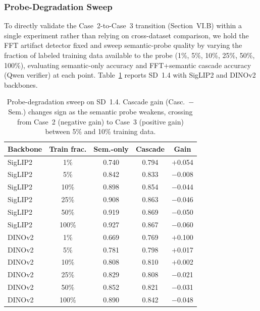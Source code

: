 \documentclass{ieeeaccess}
\begin{document}
\subsubsection{Probe-Degradation Sweep}
\label{sec:limited_data}

To directly validate the Case~2-to-Case~3 transition (Section~VI.B) within a single
experiment rather than relying on cross-dataset comparison, we hold the FFT artifact
detector fixed and sweep semantic-probe quality by varying the fraction of labeled
training data available to the probe (1\%, 5\%, 10\%, 25\%, 50\%, 100\%), evaluating
semantic-only accuracy and FFT+semantic cascade accuracy (Qwen verifier) at each point.
Table~\ref{tab:limited_data} reports SD~1.4 with SigLIP2 and DINOv2 backbones.

\begin{table}[h]
\centering
\caption{Probe-degradation sweep on SD~1.4. Cascade gain (Casc.\ $-$ Sem.) changes sign
as the semantic probe weakens, crossing from Case~2 (negative gain) to Case~3 (positive
gain) between 5\% and 10\% training data.}
\label{tab:limited_data}
\small
\begin{tabular}{lcccc}
\toprule
Backbone & Train frac. & Sem.-only & Cascade & Gain \\
\midrule
SigLIP2  & 1\%   & 0.740 & 0.794 & $+$0.054 \\
SigLIP2  & 5\%   & 0.842 & 0.833 & $-$0.008 \\
SigLIP2  & 10\%  & 0.898 & 0.854 & $-$0.044 \\
SigLIP2  & 25\%  & 0.908 & 0.863 & $-$0.046 \\
SigLIP2  & 50\%  & 0.919 & 0.869 & $-$0.050 \\
SigLIP2  & 100\% & 0.927 & 0.867 & $-$0.060 \\
\midrule
DINOv2   & 1\%   & 0.669 & 0.769 & $+$0.100 \\
DINOv2   & 5\%   & 0.781 & 0.798 & $+$0.017 \\
DINOv2   & 10\%  & 0.808 & 0.810 & $+$0.002 \\
DINOv2   & 25\%  & 0.829 & 0.808 & $-$0.021 \\
DINOv2   & 50\%  & 0.852 & 0.821 & $-$0.031 \\
DINOv2   & 100\% & 0.890 & 0.842 & $-$0.048 \\
\bottomrule
\end{tabular}
\end{table}
\end{document}
